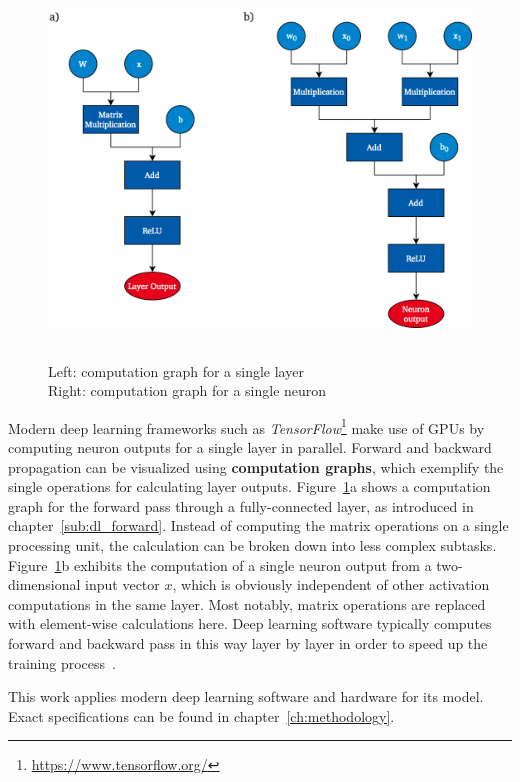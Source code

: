 \begin{figure}[h]
  \centering
  \includegraphics[height=10cm]{img/computation_graph_3}
  \caption[Computation graph for single layer and neuron]{Left: computation graph for a single layer \\ Right: computation graph for a single neuron}
\label{fig:comp_graph}
\end{figure}

Modern deep learning frameworks such as \textit{TensorFlow}\footnote{\url{https://www.tensorflow.org/}}
make use of GPUs by computing neuron outputs for a single layer in parallel.
Forward and backward propagation can be visualized using \textbf{computation
graphs}, which exemplify the single operations for calculating layer outputs.
Figure~\ref{fig:comp_graph}a shows a computation graph for the forward
pass through a fully-connected layer, as introduced in chapter~\ref{sub:dl_forward}.
Instead of computing the matrix operations on a single processing unit, the
calculation can be broken down into less complex subtasks.
Figure~\ref{fig:comp_graph}b exhibits the computation of a single neuron output
from a two-dimensional input vector $x$, which is obviously independent of
other activation computations in the same layer.
Most notably, matrix operations are replaced with element-wise calculations here.
Deep learning software typically computes forward and backward pass in this way
layer by layer in order to speed up the training process~\cite{Abadi2016}.

This work applies modern deep learning software and hardware for its model.
Exact specifications can be found in chapter~\ref{ch:methodology}.


